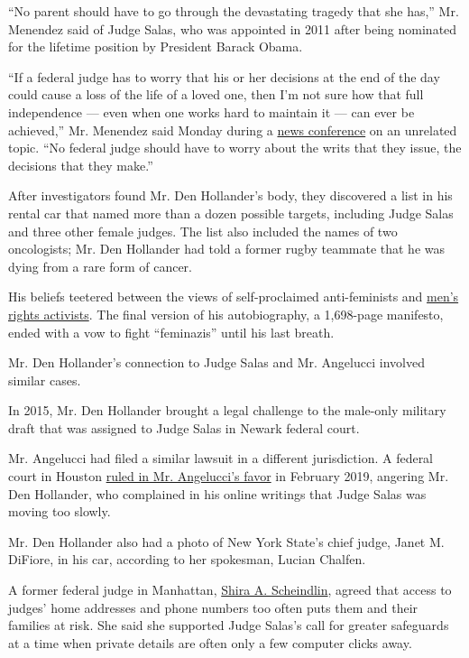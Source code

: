 ``No parent should have to go through the devastating tragedy that she
has,'' Mr. Menendez said of Judge Salas, who was appointed in 2011 after
being nominated for the lifetime position by President Barack Obama.

``If a federal judge has to worry that his or her decisions at the end
of the day could cause a loss of the life of a loved one, then I'm not
sure how that full independence --- even when one works hard to maintain
it --- can ever be achieved,'' Mr. Menendez said Monday during a
\href{https://www.facebookcorewwwi.onion/senatormenendez/videos/721816791697781}{news
conference} on an unrelated topic. ``No federal judge should have to
worry about the writs that they issue, the decisions that they make.''

After investigators found Mr. Den Hollander's body, they discovered a
list in his rental car that named more than a dozen possible targets,
including Judge Salas and three other female judges. The list also
included the names of two oncologists; Mr. Den Hollander had told a
former rugby teammate that he was dying from a rare form of cancer.

His beliefs teetered between the views of self-proclaimed anti-feminists
and
\href{https://www.nytimes3xbfgragh.onion/2018/07/13/style/mens-rights-movement.html}{men's
rights activists}. The final version of his autobiography, a 1,698-page
manifesto, ended with a vow to fight ``feminazis'' until his last
breath.

Mr. Den Hollander's connection to Judge Salas and Mr. Angelucci involved
similar cases.

In 2015, Mr. Den Hollander brought a legal challenge to the male-only
military draft that was assigned to Judge Salas in Newark federal court.

Mr. Angelucci had filed a similar lawsuit in a different jurisdiction. A
federal court in Houston
\href{https://www.nytimes3xbfgragh.onion/2019/02/24/us/military-draft-men-unconstitutional.html}{ruled
in Mr. Angelucci's favor} in February 2019, angering Mr. Den Hollander,
who complained in his online writings that Judge Salas was moving too
slowly.

Mr. Den Hollander also had a photo of New York State's chief judge,
Janet M. DiFiore, in his car, according to her spokesman, Lucian
Chalfen.

A former federal judge in Manhattan,
\href{https://www.nytimes3xbfgragh.onion/2016/03/24/nyregion/shira-scheindlin-judge-behind-stop-and-frisk-ruling-will-step-down.html?searchResultPosition=2}{Shira
A. Scheindlin}, agreed that access to judges' home addresses and phone
numbers too often puts them and their families at risk. She said she
supported Judge Salas's call for greater safeguards at a time when
private details are often only a few computer clicks away.

